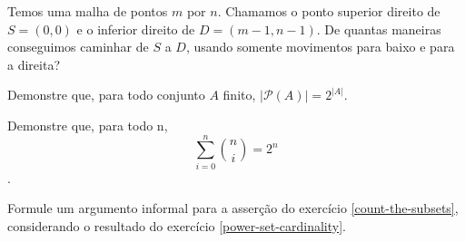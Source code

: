 \begin{exercise}
Temos uma malha de pontos $m$ por $n$. Chamamos o ponto superior direito de $S = (0,0)$ e o inferior direito de $D = (m-1, n-1)$. De quantas maneiras conseguimos caminhar de $S$ a $D$, usando somente movimentos para baixo e para a direita?
\end{exercise}

\begin{exercise}
\label{power-set-cardinality}
Demonstre que, para todo conjunto $A$ finito, $|\mathcal{P}(A)| = 2^{|A|}$.
\end{exercise}

\begin{exercise}
\label{count-the-subsets}
Demonstre que, para todo n, $$\sum_{i=0}^n \binom{n}{i} = 2^n$$.
\end{exercise}

\begin{exercise}
Formule um argumento informal para a asserção do exercício \ref{count-the-subsets}, considerando o resultado do exercício \ref{power-set-cardinality}.
\end{exercise}

